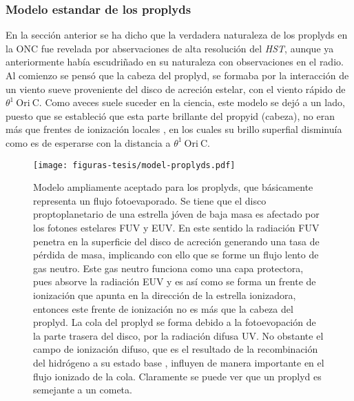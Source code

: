 \documentclass{article}
\begin{document}
\subsubsection{Modelo estandar de los proplyds}
\label{sec:modelo}

En la sección anterior se ha dicho que la verdadera naturaleza de los proplyds en la ONC fue revelada por abservaciones de alta resolución del \textit{HST}, aunque ya anteriormente \citet{Churchwell:1987} había escudriñado en su naturaleza  con observaciones en el radio. Al comienzo se pensó que la cabeza del proplyd, se formaba por la interacción de un viento sueve proveniente del disco de acreción estelar, con el viento rápido de \(\theta^1\ \text{Ori}\ \text{C}\). Como aveces suele suceder en la ciencia, este modelo se dejó a un lado, puesto que se estableció que esta parte brillante del propyid (cabeza), no eran más que frentes de ionización locales \citep{Odell:1994}, en los cuales su brillo superfial disminuía como es de esperarse con la distancia a  \(\theta^1\ \text{Ori}\ \text{C}\).\\

\begin{figure}
  \centering
  \texttt{[image: figuras-tesis/model-proplyds.pdf]}
  \caption{Modelo ampliamente aceptado para los proplyds, que básicamente representa un flujo fotoevaporado. Se tiene que el disco proptoplanetario de una estrella jóven de baja masa es afectado por los fotones estelares FUV y EUV. En este sentido la radiación FUV penetra en la superficie del disco de acreción generando una tasa de pérdida de masa, implicando con ello que se forme un flujo lento de gas neutro. Este gas neutro funciona como una capa protectora, pues absorve la radiación EUV y es así como se forma un frente de ionización que apunta en la dirección de la estrella ionizadora, entonces este frente de ionización no es más que la cabeza del proplyd. La cola del proplyd se forma debido a la fotoevopación de la parte trasera  del disco, por la radiación difusa UV. No obstante el campo de ionización difuso, que es el resultado de la recombinación del hidrógeno a su estado base \citep{Henney:1999a}, influyen de manera importante en el flujo ionizado de la cola. Claramente se puede ver que un proplyd es semejante a un cometa.  }
  \label{fig:modelo-proplyd}
\end{figure}
\end{document}
